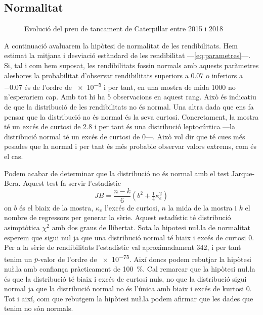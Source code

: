 \documentclass{article}
\numberwithin{table}{section}
\numberwithin{figure}{section}
\numberwithin{equation}{section}
\begin{document}
\subsection{Normalitat}
\begin{figure}[H]
	\centering \sffamily \small
	
	\caption{Evolució del preu de tancament de Caterpillar entre 2015 i 2018}
	\label{fig:distribucio rendibilitats}
\end{figure}
A continuació avaluarem la hipòtesi de normalitat de les rendibilitats. Hem estimat la mitjana i desviació estàndard de les rendibilitat ---\cref{eq:parametres}---. Si, tal i com hem suposat, les rendibilitats fossin normals amb aquests paràmetres aleshores la probabilitat d'observar rendibilitats superiors a \num{0.07} o inferiors a \num{-0.07} és de l'ordre de \num{e-5} i per tant, en una mostra de mida 1000 no n'esperariem cap. Amb tot hi ha 5 observacions en aquest rang. Això és indicatiu de que la distribució de les rendibilitats no és normal. Una altra dada que ens fa pensar que la distribució no és normal és la seva curtosi. Concretament, la mostra té un excés de curtosi de \num{2.8} i per tant és una distribució leptocúrtica ---la distribució normal té un excés de curtosi de 0---. Això vol dir que té cues més pesades que la normal i per tant és més probable observar valors extrems, com és el cas. 

Podem acabar de determinar que la distribució no és normal amb el test Jarque-Bera. Aquest test fa servir l'estadístic
\begin{equation} \label{eqn:jarque-bera}
	JB = \frac{n-k}{6}\left(b^2 + \tfrac{1}{4}\kappa_e^2\right)
\end{equation}
on \( b \) és el biaix de la mostra, \( \kappa_e \) l'excés de curtosi, \( n \) la mida de la mostra i \( k \) el nombre de regressors per generar la sèrie. Aquest estadístic té distribució asimptòtica \( \chi^2 \) amb dos graus de llibertat. Sota la hipotesi nu\l.la de normalitat esperem que sigui nul ja que una distribució normal té biaix i excés de curtosi 0. Per a la sèrie de rendibilitats l'estadístic val aproximadament \num{342}, i per tant tenim un \( p \)-valor de l'ordre de \num{e-75}. Així doncs podem rebutjar la hipòtesi nu\l.la amb confiança pràcticament de \SI{100}{\percent}. Cal remarcar que la hipòtesi nu\l.la és que la distribució té biaix i excés de curtosi nuls, no que la distribució sigui normal ja que la distribució normal no és l'única amb biaix i excés de kurtosi 0. Tot i així, com que rebutgem la hipòtesi nu\l.la podem afirmar que les dades que tenim no són normals. 
\end{document}
